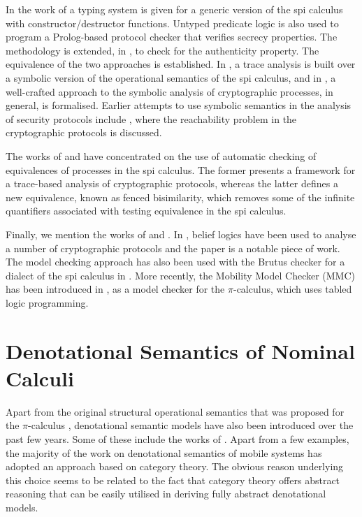 \documentclass[10pt,a4paper,final,oneside,fleqn]{book}
\begin{document}
In the work of \cite{abadi2} a typing system is given for a generic version of the spi calculus with constructor/destructor functions.  Untyped predicate logic is also used to program a Prolog-based protocol checker that verifies secrecy properties.  The methodology is extended, in \cite{blanchet1}, to check for the authenticity property. The equivalence of the two approaches is established.  In \cite{boreale1,boreale2}, a trace analysis is built over a symbolic version of the operational semantics of the spi calculus, and in \cite{amadio2}, a well-crafted approach to the symbolic analysis of cryptographic processes, in general, is formalised.  Earlier attempts to use symbolic semantics in the analysis of security protocols include \cite{huima1,amadio1}, where the reachability problem in the cryptographic protocols is discussed.

The works of \cite{elkjaer1} and \cite{cortier1} have concentrated on the use of automatic checking of equivalences of processes in the spi calculus.  The former presents a framework for a trace-based analysis of cryptographic protocols, whereas the latter defines a new equivalence, known as fenced bisimilarity, which removes some of the infinite quantifiers associated with testing equivalence in the spi calculus.

Finally, we mention the works of \cite{burrows1} and \cite{gnesi1}.  In \cite{burrows1}, belief logics have been used to analyse a number of cryptographic protocols and the paper is a notable piece of work.  The model checking approach has also been used with the Brutus checker for a dialect of the spi calculus in \cite{gnesi1}. More recently, the Mobility Model Checker (MMC) has been introduced in \cite{yang1}, as a model checker for the $\pi$-calculus, which uses tabled logic programming.
\section{Denotational Semantics of Nominal Calculi}
Apart from the original structural operational semantics that was proposed for the $\pi$-calculus \cite{milner1}, denotational semantic models have also been introduced over the past few years.  Some of these include the works of \cite{bruni1,busi1,cattani1,fiore1,hartonas1,hennessy1,stark1}.  Apart from a few examples, the majority of the work on denotational semantics of mobile systems has adopted an approach based on category theory.  The obvious reason underlying this choice seems to be related to the fact that category theory offers abstract reasoning that can be easily utilised in deriving fully abstract denotational models.
\end{document}
